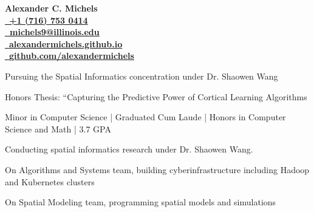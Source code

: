 \documentclass{acmresume}
\begin{document}
	
	\begin{multicols}{2}
		\vspace*{.15cm}
		\textbf{\Huge Alexander C. Michels} \\
		\columnbreak
		\hfill\href{tel:17167530414}{\faPhone~\textbf{+1 (716) 753 0414}} \\
        \hfill\href{mailto:alexandercm4297@gmail.com}{\textbf{\faEnvelope~michels9@illinois.edu}} \\
		\hfill\href{http://alexandermichels.github.io}{\faGlobeAmericas~\textbf{alexandermichels.github.io}} \\
		\hfill\href{https://github.com/alexandermichels}{\faGithub~\textbf{github.com/alexandermichels}}
	\end{multicols}
	
	
		\begin{titemize}
			\item{Pursuing the Spatial Informatics concentration under Dr. Shaowen Wang}
		\end{titemize}

		\begin{titemize}
            \item Honors Thesis: ``Capturing the Predictive Power of Cortical Learning Algorithms
			\item{Minor in Computer Science | Graduated Cum Laude | Honors in Computer Science and Math | 3.7 GPA}
		\end{titemize}
	
	
        \begin{titemize}
            \item Conducting spatial informatics research under Dr. Shaowen Wang.
            \item On Algorithms and Systems team, building cyberinfrastructure including Hadoop and Kubernetes clusters
            \item On Spatial Modeling team,  programming spatial models and simulations
        \end{titemize}
	
\end{document}
